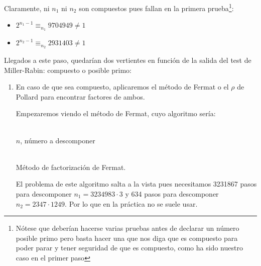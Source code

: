 \begin{enumerate}
		Claramente, ni $n_1$ ni $n_2$ son compuestos pues fallan en la primera prueba\footnote{Nótese que deberían
		hacerse varias pruebas antes de declarar un número posible primo pero basta hacer una que nos diga que es
		compuesto para poder parar y tener seguridad de que es compuesto, como ha sido nuestro caso en el primer
		paso}:
		\begin{itemize}
			\item $2^{n_1-1} \equiv_{n_1} 9704949 \neq 1$
			\item $2^{n_2-1} \equiv_{n_2} 2931403 \neq 1$
		\end{itemize}
		
		Llegados a este paso, quedarían dos vertientes en función de la salida del test de Miller-Rabin: compuesto
		o posible primo:
		
		\begin{enumerate}
			\item En caso de que sea compuesto, aplicaremos el método de Fermat o el $\rho$ de Pollard para
			encontrar factores de ambos.
			
			Empezaremos viendo el método de Fermat, cuyo algoritmo sería:
			\begin{algorithm}[H]
			\begin{algorithmic}[1]
				\REQUIRE \ \\
					\texttt{$n$}, número a descomponer \\ \
				\ELSE
						\ENDIF
					\ENDWHILE
				\ENDIF
			\end{algorithmic}
			\caption{Método de factorización de Fermat.}
			\label{Fermat-factors}
			\end{algorithm}
			
			El problema de este algoritmo salta a la vista pues necesitamos 3231867 pasos para descomponer
			$n_1 = 3234983 \cdot 3$ y 634 pasos para descomponer $n_2 = 2347 \cdot 1249$. Por lo que en la
			práctica no se suele usar.
		\end{enumerate}
	\end{enumerate}